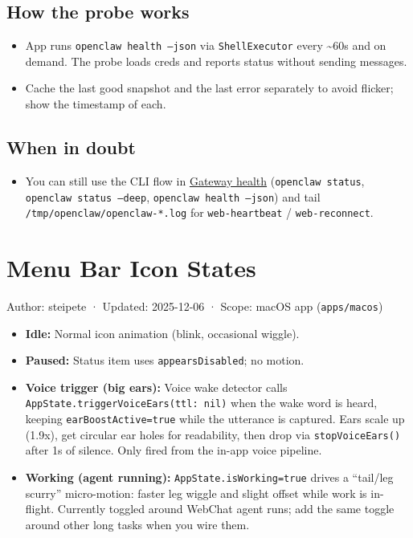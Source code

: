 \subsection{How the probe works}


\begin{itemize}
  \item App runs \texttt{openclaw health --json} via \texttt{ShellExecutor} every \textasciitilde{}60s and on demand. The probe loads creds and reports status without sending messages.
  \item Cache the last good snapshot and the last error separately to avoid flicker; show the timestamp of each.
\end{itemize}


\subsection{When in doubt}


\begin{itemize}
  \item You can still use the CLI flow in \href{/gateway/health}{Gateway health} (\texttt{openclaw status}, \texttt{openclaw status --deep}, \texttt{openclaw health --json}) and tail \texttt{/tmp/openclaw/openclaw-*.log} for \texttt{web-heartbeat} / \texttt{web-reconnect}.
\end{itemize}



\clearpage

\section{Menu Bar Icon States}


Author: steipete · Updated: 2025-12-06 · Scope: macOS app (\texttt{apps/macos})

\begin{itemize}
  \item \textbf{Idle:} Normal icon animation (blink, occasional wiggle).
  \item \textbf{Paused:} Status item uses \texttt{appearsDisabled}; no motion.
  \item \textbf{Voice trigger (big ears):} Voice wake detector calls \texttt{AppState.triggerVoiceEars(ttl: nil)} when the wake word is heard, keeping \texttt{earBoostActive=true} while the utterance is captured. Ears scale up (1.9x), get circular ear holes for readability, then drop via \texttt{stopVoiceEars()} after 1s of silence. Only fired from the in-app voice pipeline.
  \item \textbf{Working (agent running):} \texttt{AppState.isWorking=true} drives a “tail/leg scurry” micro-motion: faster leg wiggle and slight offset while work is in-flight. Currently toggled around WebChat agent runs; add the same toggle around other long tasks when you wire them.
\end{itemize}


